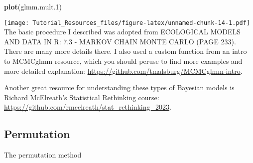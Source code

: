 \documentclass[
]{article}
\newenvironment{Shaded}{\begin{snugshade}}{\end{snugshade}}
\newcommand{\FloatTok}[1]{\textcolor[rgb]{0.00,0.00,0.81}{#1}}
\newcommand{\FunctionTok}[1]{\textcolor[rgb]{0.13,0.29,0.53}{\textbf{#1}}}
\newcommand{\NormalTok}[1]{#1}
\begin{document}
\begin{Shaded}
\begin{Highlighting}[]
\FunctionTok{plot}\NormalTok{(glmm.mult}\FloatTok{.1}\NormalTok{)}
\end{Highlighting}
\end{Shaded}

\texttt{[image: Tutorial\_Resources\_files/figure-latex/unnamed-chunk-14-1.pdf]}
The basic procedure I described was adopted from ECOLOGICAL MODELS AND
DATA IN R: 7.3 - MARKOV CHAIN MONTE CARLO (PAGE 233). There are many
more details there. I also used a custom function from an intro to
MCMCglmm resource, which you should peruse to find more examples and
more detailed explanation:
\url{https://github.com/tmalsburg/MCMCglmm-intro}.

Another great resource for understanding these types of Bayesian models
is Richard McElreath's Statistical Rethinking course:
\url{https://github.com/rmcelreath/stat_rethinking_2023}.

\hypertarget{permutation}{%
\subsection{Permutation}\label{permutation}}

The permutation method
\end{document}

